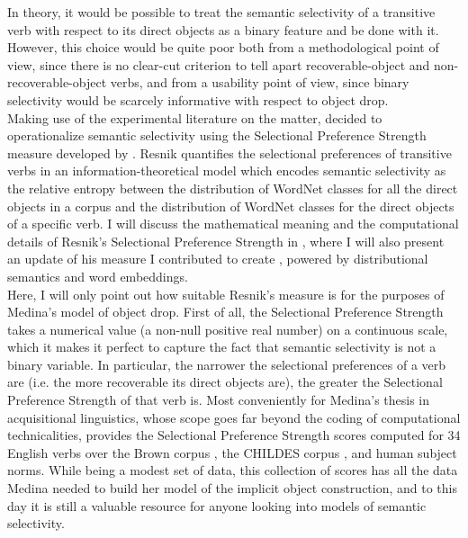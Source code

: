 In theory, it would be possible to treat the semantic selectivity of a transitive verb with respect to its direct objects as a binary feature and be done with it. However, this choice would be quite poor both from a methodological point of view, since there is no clear-cut criterion to tell apart recoverable-object and non-recoverable-object verbs, and from a usability point of view, since binary selectivity would be scarcely informative with respect to object drop.\\
Making use of the experimental literature on the matter, \textcite{Medina2007} decided to operationalize semantic selectivity using the Selectional Preference Strength measure developed by \textcite{Resnik1993, Resnik1996}. Resnik quantifies the selectional preferences of transitive verbs in an information-theoretical model which encodes semantic selectivity as the relative entropy between the distribution of WordNet \parencite{beckwith1991wordnet, Miller1995} classes for all the direct objects in a corpus and the distribution of WordNet classes for the direct objects of a specific verb. I will discuss the mathematical meaning and the computational details of Resnik's Selectional Preference Strength in , where I will also present an update of his measure I contributed to create \parencite{CappelliLenciPISA}, powered by distributional semantics and word embeddings.\\
Here, I will only point out how suitable Resnik's measure is for the purposes of Medina's model of object drop. First of all, the Selectional Preference Strength takes a numerical value (a non-null positive real number) on a continuous scale, which it makes it perfect to capture the fact that semantic selectivity is not a binary variable. In particular, the narrower the selectional preferences of a verb are (i.e. the more recoverable its direct objects are), the greater the Selectional Preference Strength of that verb is. Most conveniently for Medina's thesis in acquisitional linguistics, whose scope goes far beyond the coding of computational technicalities, \textcite[150]{Resnik1996} provides the Selectional Preference Strength scores computed for 34 English verbs over the Brown corpus \parencite{kucera1967brownCorpus}, the CHILDES corpus \parencite{macwhinney2000childesCorpus}, and human subject norms. While being a modest set of data, this collection of scores has all the data Medina needed to build her model of the implicit object construction, and to this day it is still a valuable resource for anyone looking into models of semantic selectivity.


